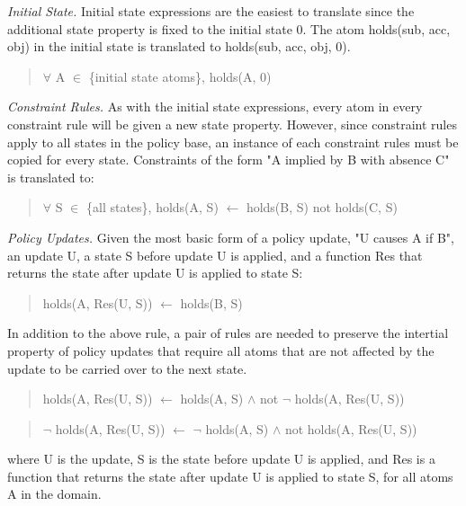 \documentclass{llncs}
\begin{document}
        \emph{Initial State.} Initial state expressions are the easiest to
        translate since the additional state property is fixed to the initial
        state 0. The atom holds(sub, acc, obj) in the initial state is
        translated to holds(sub, acc, obj, 0).

        \begin{quote}
          $\forall$ A $\in$ \{initial state atoms\}, holds(A, 0)
        \end{quote}

        \emph{Constraint Rules.} As with the initial state expressions, every
        atom in every constraint rule will be given a new state property.
        However, since constraint rules apply to all states in the policy
        base, an instance of each constraint rules must be copied for every
        state. Constraints of the form "A implied by B with absence C" is
        translated to:

        \begin{quote}
          $\forall$ S $\in$ \{all states\},
          holds(A, S) $\leftarrow$ holds(B, S) not holds(C, S)
        \end{quote}

        \emph{Policy Updates.} Given the most basic form of a policy update,
        "U causes A if B", an update U, a state S before update U is applied,
        and a function Res that returns the state after update U is applied
        to state S:

        \begin{quote}
          holds(A, Res(U, S)) $\leftarrow$ holds(B, S)
        \end{quote}
 
        In addition to the above rule, a pair of rules are needed to preserve
        the intertial property of policy updates that require all atoms that
        are not affected by the update to be carried over to the next state.

        \begin{quote}
          holds(A, Res(U, S)) $\leftarrow$ holds(A, S) $\land$ not $\lnot$
          holds(A, Res(U, S))
        \end{quote}
        \begin{quote}
          $\lnot$ holds(A, Res(U, S)) $\leftarrow$ $\lnot$ holds(A, S) $\land$
          not holds(A, Res(U, S))
        \end{quote}

        where U is the update, S is the state before update U is applied, and 
        Res is a function that returns the state after update U is applied to
        state S, for all atoms A in the domain.
\end{document}
